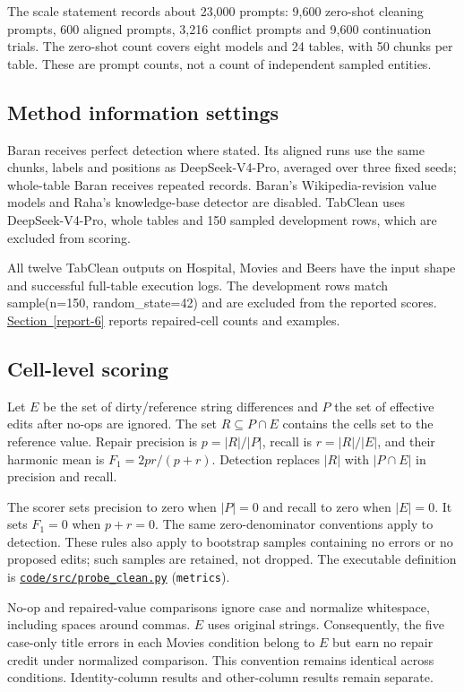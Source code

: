 \documentclass[10pt,a4paper]{article}
\begin{document}
The scale statement records about 23,000 prompts: 9,600 zero-shot cleaning prompts, 600 aligned prompts, 3,216 conflict prompts and 9,600 continuation trials. The zero-shot count covers eight models and 24 tables, with 50 chunks per table. These are prompt counts, not a count of independent sampled entities.

\subsection{Method information settings}

Baran receives perfect detection where stated. Its aligned runs use the same chunks, labels and positions as DeepSeek-V4-Pro, averaged over three fixed seeds; whole-table Baran receives repeated records. Baran's Wikipedia-revision value models and Raha's knowledge-base detector are disabled. TabClean uses DeepSeek-V4-Pro, whole tables and 150 sampled development rows, which are excluded from scoring.

All twelve TabClean outputs on Hospital, Movies and Beers have the input shape and successful full-table execution logs. The development rows match {\ttfamily\small sample(n=150, random\_\allowbreak{}state=42)} and are excluded from the reported scores. \hyperlink{companion-6}{Section~\ref{report-6}} reports repaired-cell counts and examples.

\subsection{Cell-level scoring}

Let \(E\) be the set of dirty/reference string differences and \(P\) the set of effective edits after no-ops are ignored. The set \(R\subseteq P\cap E\) contains the cells set to the reference value. Repair precision is \(p=|R|/|P|\), recall is \(r=|R|/|E|\), and their harmonic mean is \(F_1=2pr/(p+r)\). Detection replaces \(|R|\) with \(|P\cap E|\) in precision and recall.

The scorer sets precision to zero when \(|P|=0\) and recall to zero when \(|E|=0\). It sets \(F_1=0\) when \(p+r=0\). The same zero-denominator conventions apply to detection. These rules also apply to bootstrap samples containing no errors or no proposed edits; such samples are retained, not dropped. The executable definition is \href{https://github.com/hinsonver/CoRe-Benchmark/blob/main/code/src/probe_clean.py}{\nolinkurl{code/src/probe_clean.py}} (\texttt{metrics}).

No-op and repaired-value comparisons ignore case and normalize whitespace, including spaces around commas. \(E\) uses original strings. Consequently, the five case-only title errors in each Movies condition belong to \(E\) but earn no repair credit under normalized comparison. This convention remains identical across conditions. Identity-column results and other-column results remain separate.
\end{document}
